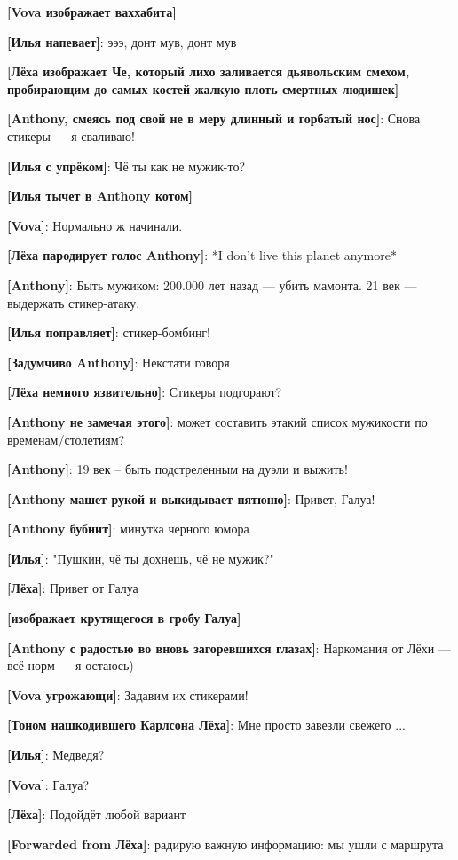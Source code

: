 \begin{flushleft}
\textbf{[Vova изображает ваххабита]}

\textbf{[Илья напевает]}: эээ, донт мув, донт мув

\textbf{[Лёха изображает Че, который лихо заливается дьявольским смехом, пробирающим до самых костей жалкую плоть смертных людишек]}

\textbf{[Anthony, смеясь под свой не в меру длинный и горбатый нос]}: Снова стикеры --- я сваливаю!

\textbf{[Илья с упрёком]}: Чё ты как не мужик-то?

\textbf{[Илья тычет в Anthony котом]}

\textbf{[Vova]}: Нормально ж начинали.

\textbf{[Лёха пародирует голос Anthony]}: *I don't live this planet anymore*

\textbf{[Anthony]}: Быть мужиком: 200.000 лет назад --- убить мамонта. 21 век --- выдержать стикер-атаку.

\textbf{[Илья поправляет]}: стикер-бомбинг!

\textbf{[Задумчиво Anthony]}: Некстати говоря

\textbf{[Лёха немного язвительно]}: Стикеры подгорают?

\textbf{[Anthony не замечая этого]}: может составить этакий список мужикости по временам/столетиям?

\textbf{[Anthony]}: 19 век -- быть подстреленным на дуэли и выжить!

\textbf{[Anthony машет рукой и выкидывает пятюню]}: Привет, Галуа!

\textbf{[Anthony бубнит]}: минутка черного юмора

\textbf{[Илья]}: "Пушкин, чё ты дохнешь, чё не мужик?"

\textbf{[Лёха]}: Привет от Галуа

\textbf{[изображает крутящегося в гробу Галуа]}

\textbf{[Anthony с радостью во вновь загоревшихся глазах]}: Наркомания от Лёхи --- всё норм --- я остаюсь)

\textbf{[Vova угрожающи]}: Задавим их стикерами!

\textbf{[Тоном нашкодившего Карлсона Лёха]}: Мне просто завезли свежего ...

\textbf{[Илья]}: Медведя?

\textbf{[Vova]}: Галуа?

\textbf{[Лёха]}: Подойдёт любой вариант

\textbf{[Forwarded from Лёха]}: радирую важную информацию: мы ушли с маршрута


\end{flushleft}
